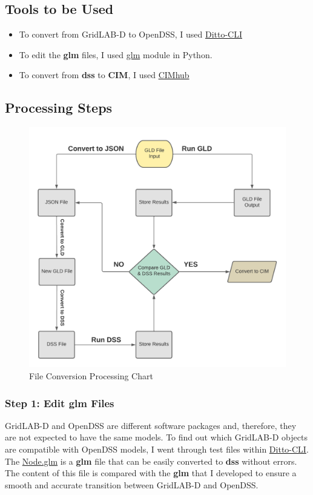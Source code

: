 \subsection{Tools to be Used}

\begin{itemize}
    \item To convert from GridLAB-D to OpenDSS, I used \href{https://github.com/NREL/ditto}{Ditto-CLI}
    \item To edit the \textbf{glm} files, I used \href{https://github.com/NREL/glm}{glm} module in Python.
    \item To convert from \textbf{dss} to \textbf{CIM}, I used \href{https://cimhub.readthedocs.io/en/latest/Tutorial.html#ieee-123-bus-base-case}{CIMhub}
\end{itemize}

\subsection{Processing Steps}

\begin{figure}[htp!]
    \centering
    \includegraphics[width=0.7\columnwidth]{Pictures/glm_conversion_tool.png}
    \caption{File Conversion Processing Chart}
    \label{fig:me_conversion}
\end{figure}

\subsubsection{Step 1: Edit \textbf{glm} Files}

GridLAB-D and OpenDSS are different software packages and, therefore, they are not expected to have the same models. To find out which GridLAB-D objects are compatible with OpenDSS models, I went through test files 
within \href{https://github.com/NREL/ditto}{Ditto-CLI}. The \href{run: /home/deras/Desktop/Midrar_work/ditto/tests/data/small_cases/gridlabd/ieee_4node/node.glm}{Node.glm} is a \textbf{glm} file that can be easily 
converted to \textbf{dss} without errors. The content of this file is compared with the \textbf{glm} that I developed to ensure a smooth and accurate transition between GridLAB-D and OpenDSS.